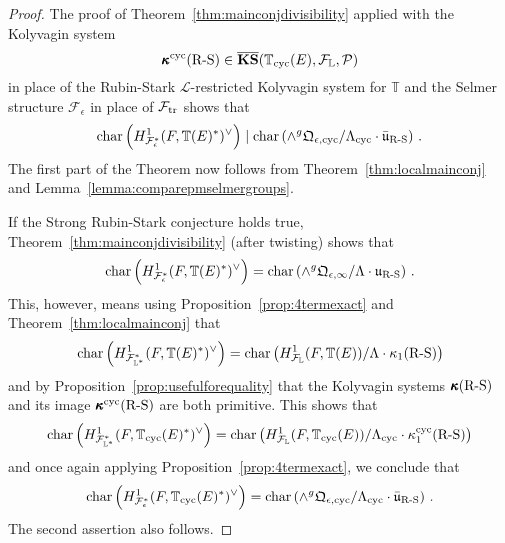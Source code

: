 \documentclass[12pt]{amsart}
\numberwithin{equation}{section}
\begin{document}
\begin{proof}
The proof of Theorem~\ref{thm:mainconjdivisibility} applied with the Kolyvagin system 
$$\pmb{\kappa}^{\textup{cyc}}(\textup{R-S})\in\overline{\mathbf{KS}}({\mathbb{T}}_{\textup{cyc}}(E),{\mathcal{F}}_{\mathbb{L}},{\mathcal{P}})$$
in place of the Rubin-Stark ${\mathcal{L}}$-restricted Kolyvagin system for ${\mathbb{T}}$ and the Selmer structure ${\mathcal{F}}_\epsilon$ in place of ${\mathcal{F}}_{\textup{tr}}$ shows that 
$$\textup{char}\left(H^1_{{\mathcal{F}}^*_{\epsilon}}(F,{\mathbb{T}}(E)^*)^\vee\right)\mid \textup{char} \left(\wedge^g \frak{Q}_{\epsilon,\textup{cyc}}/{\Lambda}_{\textup{cyc}}\cdot\bar{\frak{u}}_{\textup{R-S}} \right)\,.$$
The first part of the Theorem now follows from Theorem~\ref{thm:localmainconj} and Lemma~\ref{lemma:comparepmselmergroups}.

If the Strong Rubin-Stark conjecture holds true, Theorem~\ref{thm:mainconjdivisibility} (after twisting) shows that 
$$\textup{char}\left(H^1_{{\mathcal{F}}^*_{\epsilon}}(F,{\mathbb{T}}(E)^*)^\vee\right)=\textup{char} \left(\wedge^g \frak{Q}_{\epsilon,\infty}/{\Lambda}\cdot{\frak{u}}_{\textup{R-S}} \right)\,.$$
This, however, means using Proposition~\ref{prop:4termexact} and Theorem~\ref{thm:localmainconj} that
$$\textup{char}\left(H^1_{{\mathcal{F}}^*_{\mathbb{L}^*}}(F,{\mathbb{T}}(E)^*)^\vee\right)=\textup{char} \left(H^1_{{\mathcal{F}}_{\mathbb{L}}}(F,{\mathbb{T}}(E))/{\Lambda}\cdot\kappa_1(\textup{R-S}) \right)$$
and by Proposition~\ref{prop:usefulforequality} that the Kolyvagin systems  $\pmb{\kappa}(\textup{R-S})$ and its image $\pmb{\kappa}^{\textup{cyc}}(\textup{R-S})$ are both primitive. This shows that 
$$\textup{char}\left(H^1_{{\mathcal{F}}^*_{\mathbb{L}^*}}(F,{\mathbb{T}}_{\textup{cyc}}(E)^*)^\vee\right)=\textup{char} \left(H^1_{{\mathcal{F}}_{\mathbb{L}}}(F,{\mathbb{T}}_{\textup{cyc}}(E))/{\Lambda}_{\textup{cyc}}\cdot\kappa_1^{\textup{cyc}}(\textup{R-S})\right)$$
and once again applying Proposition~\ref{prop:4termexact}, we conclude that
$$\textup{char}\left(H^1_{{\mathcal{F}}^*_{\epsilon}}(F,{\mathbb{T}}_{\textup{cyc}}(E)^*)^\vee\right)= \textup{char} \left(\wedge^g \frak{Q}_{\epsilon,{\textup{cyc}}}/{\Lambda}_{\textup{cyc}}\cdot{\bar{\frak{u}}}_{\textup{R-S}} \right)\,.$$
The second assertion also follows.

\end{proof}
\end{document}
